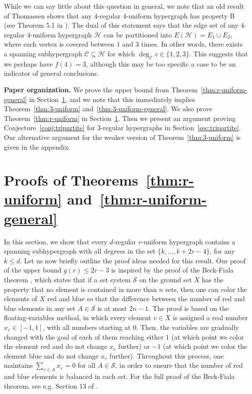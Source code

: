 \documentclass[11pt, a4paper]{article}
\numberwithin{theorem}{section} %
\theoremstyle{remark}
\theoremstyle{definition}
\def\cC{\mathcal{C}}
\def\cH{\mathcal{H}}
\def\cS{\mathcal{S}}
\begin{document}
While we can say little about this question in general, we note that an old result of Thomassen shows that any $4$-regular $4$-uniform hypergraph has property B (see Theorem 5.1 in \cite{Thomassen92}). The dual of this statement says that the edge set of any $4$-regular $4$-uniform hypergraph $\cH$ can be partitioned into $E(\cH)=E_1\cup E_2$, where each vertex is covered between $1$ and $3$ times. In other words, there exists a spanning subhypergraph $\cC\subseteq \cH$ for which $\deg_{\cC} v\in \{1, 2, 3\}$. This suggests that we perhaps have $f(4)=3$, although this may be too specific a case to be an indicator of general conclusions.

\medskip
\noindent
\textbf{Paper organization.} We prove the upper bound from Theorem~\ref{thm:r-uniform-general} in Section~\ref{sec:upper_bounds}, and we note that this immediately implies Theorem~\ref{thm:3-uniform} and~\ref{thm:3-uniform-general}. We also prove Theorem~\ref{thm:r-uniform} in Section~\ref{sec:upper_bounds}. Then we present an argument proving Conjecture~\ref{conj:tripartite} for 3-regular hypergraphs in Section~\ref{sec:tripartite}. Our alternative argument for the weaker version of Theorem~\ref{thm:3-uniform} is given in the appendix.


\section{Proofs of Theorems~\ref{thm:r-uniform} and~\ref{thm:r-uniform-general}}\label{sec:upper_bounds}

In this section, we show that every $d$-regular $r$-uniform hypergraph contains a spanning subhypergraph with all degrees in the set $\{k, \dots, k+2r-4\}$, for any $k\leq d$. Let us now briefly outline the proof ideas needed for this result. Our proof of the upper bound $g(r)\leq 2r-3$ is inspired by the proof of the Beck-Fiala theorem \cite{BeckFiala81}, which states that if a set system $\cS$ on the ground set $X$ has the property that no element is contained in more than $n$ sets, then one can color the elements of $X$ red and blue so that the difference between the number of red and blue elements in any set $A\in \cS$ is at most $2n-1$. The proof is based on the floating-variables method, in which every element $v\in X$ is assigned a real number $x_v\in [-1, 1]$, with all numbers starting at $0$. Then, the variables are gradually changed with the goal of each of them reaching either $1$ (at which point we color the element red and do not change $x_v$ further) or $-1$ (at which point we color the element blue and do not change $x_v$ further). Throughout this process, one maintains $\sum_{v\in A} x_v=0$ for all $A\in \cS$, in order to ensure that the number of red and blue elements is balanced in each set. For the full proof of the Beck-Fiala theorem, see e.g. Section 13 of \cite{AlonSpencer}.
\end{document}

